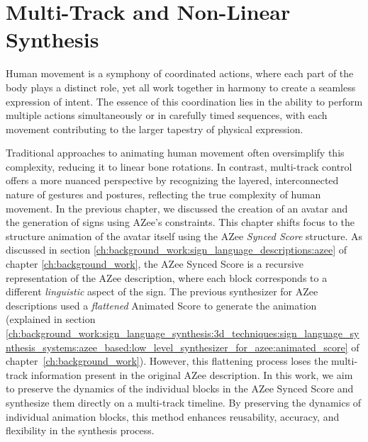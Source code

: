\documentclass[../../main.tex]{subfiles}
\begin{document}
\chapter{Multi-Track and Non-Linear Synthesis}
\label{ch:multi_track}

Human movement is a symphony of coordinated actions, where each part of the body plays a distinct role, yet all work together in harmony to create a seamless expression of intent. The essence of this coordination lies in the ability to perform multiple actions simultaneously or in carefully timed sequences, with each movement contributing to the larger tapestry of physical expression.

Traditional approaches to animating human movement often oversimplify this complexity, reducing it to linear bone rotations. In contrast, multi-track control offers a more nuanced perspective by recognizing the layered, interconnected nature of gestures and postures, reflecting the true complexity of human movement. In the previous chapter, we discussed the creation of an avatar and the generation of signs using AZee's constraints. This chapter shifts focus to the structure animation of the avatar itself using the AZee \emph{Synced Score} structure. As discussed in section \ref{ch:background_work:sign_language_descriptions:azee} of chapter \ref{ch:background_work}, the AZee Synced Score is a recursive representation of the AZee description, where each block corresponds to a different \emph{linguistic} aspect of the sign. The previous synthesizer for AZee descriptions used a \emph{flattened} Animated Score to generate the animation (explained in section \ref{ch:background_work:sign_language_synthesis:3d_techniques:sign_language_synthesis_systems:azee_based:low_level_synthesizer_for_azee:animated_score} of chapter~\ref{ch:background_work}). However, this flattening process loses the multi-track information present in the original AZee description. In this work, we aim to preserve the dynamics of the individual blocks in the AZee Synced Score and synthesize them directly on a multi-track timeline. By preserving the dynamics of individual animation blocks, this method enhances reusability, accuracy, and flexibility in the synthesis process.
\end{document}
